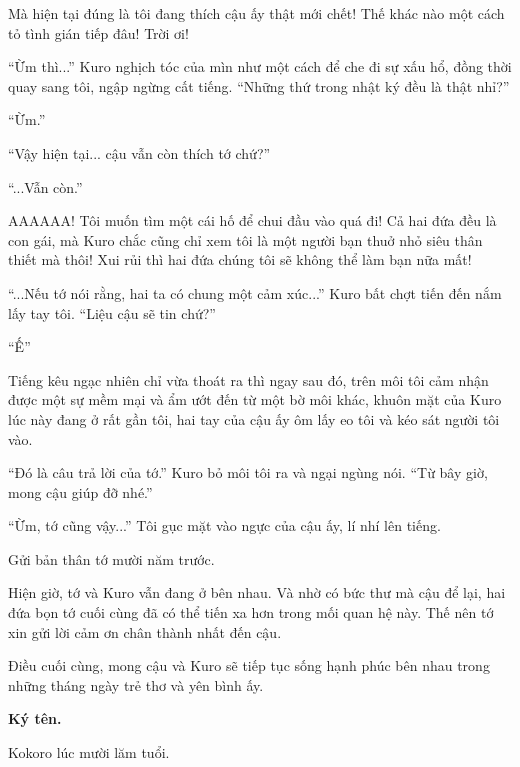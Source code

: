 {Mà hiện tại đúng là tôi đang thích cậu ấy thật mới chết! Thế khác nào
một cách tỏ tình gián tiếp đâu! Trời ơi!

``Ừm thì...'' Kuro nghịch tóc của mìn như một cách để che đi sự xấu hổ,
đồng thời quay sang tôi, ngập ngừng cất tiếng. ``Những thứ trong nhật ký
đều là thật nhỉ?''

``Ừm.''

``Vậy hiện tại... cậu vẫn còn thích tớ chứ?''

``...Vẫn còn.''

AAAAAA! Tôi muốn tìm một cái hố để chui đầu vào quá đi! Cả hai đứa đều
là con gái, mà Kuro chắc cũng chỉ xem tôi là một người bạn thuở nhỏ siêu
thân thiết mà thôi! Xui rủi thì hai đứa chúng tôi sẽ không thể làm bạn
nữa mất!

``...Nếu tớ nói rằng, hai ta có chung một cảm xúc...'' Kuro bất chợt
tiến đến nắm lấy tay tôi. ``Liệu cậu sẽ tin chứ?''

``Ế''

Tiếng kêu ngạc nhiên chỉ vừa thoát ra thì ngay sau đó, trên môi tôi cảm
nhận được một sự mềm mại và ẩm ướt đến từ một bờ môi khác, khuôn mặt của
Kuro lúc này đang ở rất gần tôi, hai tay của cậu ấy ôm lấy eo tôi và kéo
sát người tôi vào.

``Đó là câu trả lời của tớ.'' Kuro bỏ môi tôi ra và ngại ngùng nói. ``Từ
bây giờ, mong cậu giúp đỡ nhé.''

``Ừm, tớ cũng vậy...'' Tôi gục mặt vào ngực của cậu ấy, lí nhí lên
tiếng.

Gửi bản thân tớ mười năm trước.

Hiện giờ, tớ và Kuro vẫn đang ở bên nhau. Và nhờ có bức thư mà cậu để
lại, hai đứa bọn tớ cuối cùng đã có thể tiến xa hơn trong mối quan hệ
này. Thế nên tớ xin gửi lời cảm ơn chân thành nhất đến cậu.

Điều cuối cùng, mong cậu và Kuro sẽ tiếp tục sống hạnh phúc bên nhau
trong những tháng ngày trẻ thơ và yên bình ấy.
    \begin{flushright}
        \textbf{
            Ký tên.
        }

    Kokoro lúc mười lăm tuổi.
    \end{flushright}


}
